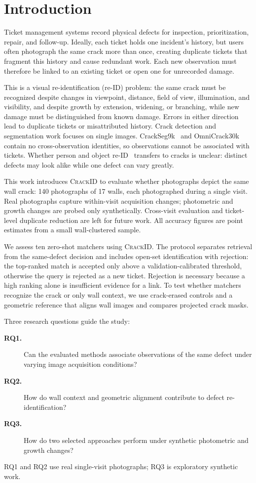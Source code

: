 \section{Introduction}

Ticket management systems record physical defects for inspection, prioritization, repair, and follow-up.
Ideally, each ticket holds one incident's history, but users often photograph the same crack more than once, creating duplicate tickets that fragment this history and cause redundant work.
Each new observation must therefore be linked to an existing ticket or open one for unrecorded damage.

This is a visual re-identification (re-ID) problem: the same crack must be recognized despite changes in viewpoint, distance, field of view, illumination, and visibility, and despite growth by extension, widening, or branching, while new damage must be distinguished from known damage.
Errors in either direction lead to duplicate tickets or misattributed history.
Crack detection and segmentation work focuses on single images.
CrackSeg9k~\cite{kulkarni2022crackseg9k} and OmniCrack30k~\cite{benz2024omnicrack30k} contain no cross-observation identities, so observations cannot be associated with tickets.
Whether person and object re-ID~\cite{zhou2019osnet,qian2024reidtrends} transfers to cracks is unclear: distinct defects may look alike while one defect can vary greatly.

This work introduces \textsc{CrackID} to evaluate whether photographs depict the same wall crack: 140 photographs of 17 walls, each photographed during a single visit.
Real photographs capture within-visit acquisition changes; photometric and growth changes are probed only synthetically.
Cross-visit evaluation and ticket-level duplicate reduction are left for future work.
All accuracy figures are point estimates from a small wall-clustered sample.

We assess ten zero-shot matchers using \textsc{CrackID}.
The protocol separates retrieval from the same-defect decision and includes open-set identification with rejection: the top-ranked match is accepted only above a validation-calibrated threshold, otherwise the query is rejected as a new ticket. Rejection is necessary because a high ranking alone is insufficient evidence for a link.
To test whether matchers recognize the crack or only wall context, we use crack-erased controls and a geometric reference that aligns wall images and compares projected crack masks.

Three research questions guide the study:
\begin{description}
  \item[\textbf{RQ1.}] Can the evaluated methods associate observations of the same defect under varying image acquisition conditions?
  \item[\textbf{RQ2.}] How do wall context and geometric alignment contribute to defect re-identification?
  \item[\textbf{RQ3.}] How do two selected approaches perform under synthetic photometric and growth changes?
\end{description}
RQ1 and RQ2 use real single-visit photographs; RQ3 is exploratory synthetic work.

